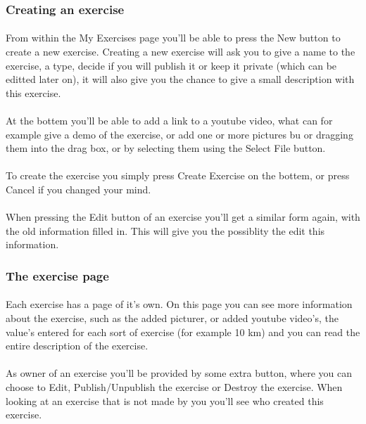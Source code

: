\documentclass[11pt,a4paper]{scrartcl}
\begin{document}
\subsubsection{Creating an exercise}
\paragraph{}From within the My Exercises page you'll be able to press the New button to create a new exercise. Creating a new exercise will ask you to give a name to the exercise, a type, decide if you will publish it or keep it private (which can be editted later on), it will also give you the chance to give a small description with this exercise.
\paragraph{}At the bottem you'll be able to add a link to a youtube video, what can for example give a demo of the exercise, or add one or more pictures bu or dragging them into the drag box, or by selecting them using the Select File button. 
\paragraph{}To create the exercise you simply press Create Exercise on the bottem, or press Cancel if you changed your mind.
\paragraph{}When pressing the Edit button of an exercise you'll get a similar form again, with the old information filled in. This will give you the possiblity the edit this information.

\subsubsection{The exercise page}
\paragraph{}Each exercise has a page of it's own. On this page you can see more information about the exercise, such as the added picturer, or added youtube video's, the value's entered for each sort of exercise (for example 10 km) and you can read the entire description of the exercise.
\paragraph{}As owner of an exercise you'll be provided by some extra button, where you can choose to Edit, Publish/Unpublish the exercise or Destroy the exercise. When looking at an exercise that is not made by you you'll see who created this exercise.
\end{document}
